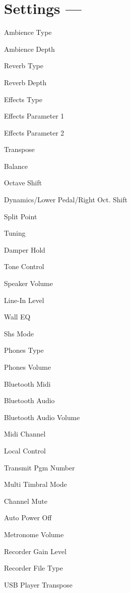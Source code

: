 \section{Settings --- \UiKey{\SET}}

Ambience Type


Ambience Depth

Reverb Type


Reverb Depth

Effects Type

Effects Parameter 1


Effects Parameter 2

Transpose


Balance

Octave Shift

Dynamics/Lower Pedal/Right Oct. Shift


Split Point




Tuning

Damper Hold

Tone Control


Speaker Volume

Line-In Level


Wall EQ

Shs Mode

Phones Type


Phones Volume

Bluetooth Midi


Bluetooth Audio

Bluetooth Audio Volume

Midi Channel


Local Control

Transmit Pgm Number


Multi Timbral Mode

Channel Mute

Auto Power Off


Metronome Volume

Recorder Gain Level


Recorder File Type

USB Player Transpose
